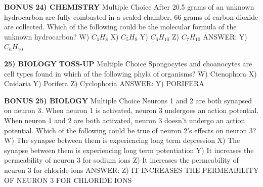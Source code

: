 \documentclass{article}
\begin{document}
\textbf{BONUS}
\textbf{24) CHEMISTRY}
Multiple Choice After 20.5 grams of an unknown hydrocarbon are fully combusted in a sealed chamber, 66 grams of carbon dioxide are collected. Which of the following could be the molecular formula of the unknown hydrocarbon?
W) $C_{4}H_{8}$
X) $C_{5}H_{8}$
Y) $C_{6}H_{10}$
Z) $C_{7}H_{10}$
ANSWER: Y) $C_{6}H_{10}$

\textbf{25) BIOLOGY}
\textbf{TOSS-UP}
Multiple Choice Spongocytes and choanocytes are cell types found in which of the following phyla of organisms?
W) Ctenophora
X) Cnidaria
Y) Porifera
Z) Cyclophoria
ANSWER: Y) PORIFERA

\textbf{BONUS}
\textbf{25) BIOLOGY}
Multiple Choice Neurons 1 and 2 are both synapsed on neuron 3. When neuron 1 is activated, neuron 3 undergoes an action potential. When neuron 1 and 2 are both activated, neuron 3 doesn't undergo an action potential. Which of the following could be true of neuron 2's effects on neuron 3?
W) The synapse between them is experiencing long term depression
X) The synapse between them is experiencing long term potentiation
Y) It increases the permeability of neuron 3 for sodium ions
Z) It increases the permeability of neuron 3 for chloride ions
ANSWER: Z) IT INCREASES THE PERMEABILITY OF NEURON 3 FOR CHLORIDE IONS
\end{document}
